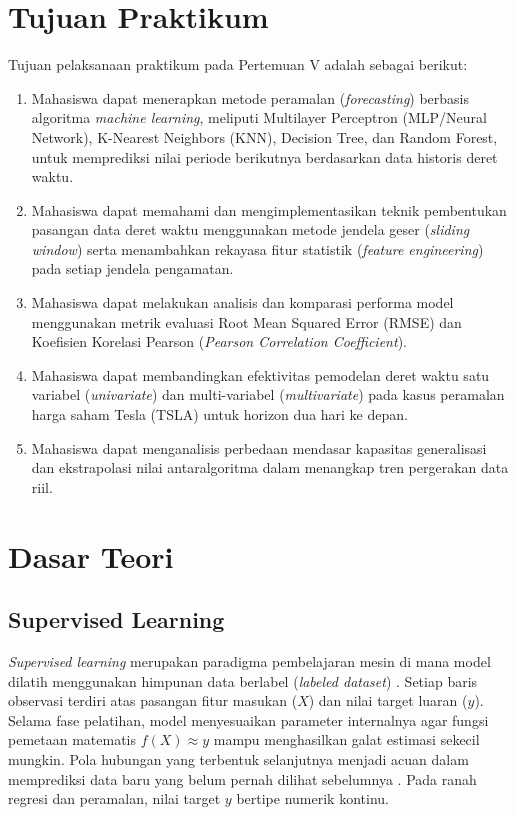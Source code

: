 \documentclass[a4paper,oneside,12pt]{report}
\begin{document}
\setcounter{page}{3}

\chapter[Tujuan Praktikum]{Tujuan Praktikum}
Tujuan pelaksanaan praktikum pada Pertemuan V adalah sebagai berikut:
\begin{enumerate}
    \item Mahasiswa dapat menerapkan metode peramalan (\textit{forecasting}) berbasis algoritma \textit{machine learning}, meliputi Multilayer Perceptron (MLP/Neural Network), K-Nearest Neighbors (KNN), Decision Tree, dan Random Forest, untuk memprediksi nilai periode berikutnya berdasarkan data historis deret waktu.
    \item Mahasiswa dapat memahami dan mengimplementasikan teknik pembentukan pasangan data deret waktu menggunakan metode jendela geser (\textit{sliding window}) serta menambahkan rekayasa fitur statistik (\textit{feature engineering}) pada setiap jendela pengamatan.
    \item Mahasiswa dapat melakukan analisis dan komparasi performa model menggunakan metrik evaluasi Root Mean Squared Error (RMSE) dan Koefisien Korelasi Pearson (\textit{Pearson Correlation Coefficient}).
    \item Mahasiswa dapat membandingkan efektivitas pemodelan deret waktu satu variabel (\textit{univariate}) dan multi-variabel (\textit{multivariate}) pada kasus peramalan harga saham Tesla (TSLA) untuk horizon dua hari ke depan.
    \item Mahasiswa dapat menganalisis perbedaan mendasar kapasitas generalisasi dan ekstrapolasi nilai antaralgoritma dalam menangkap tren pergerakan data riil.
\end{enumerate}
\clearpage

\chapter{Dasar Teori}

\section{Supervised Learning}
\textit{Supervised learning} merupakan paradigma pembelajaran mesin di mana model dilatih menggunakan himpunan data berlabel (\textit{labeled dataset}) \cite{ref_retno}. Setiap baris observasi terdiri atas pasangan fitur masukan ($X$) dan nilai target luaran ($y$). Selama fase pelatihan, model menyesuaikan parameter internalnya agar fungsi pemetaan matematis $f(X) \approx y$ mampu menghasilkan galat estimasi sekecil mungkin. Pola hubungan yang terbentuk selanjutnya menjadi acuan dalam memprediksi data baru yang belum pernah dilihat sebelumnya \cite{ref_santoso}. Pada ranah regresi dan peramalan, nilai target $y$ bertipe numerik kontinu.
\end{document}
